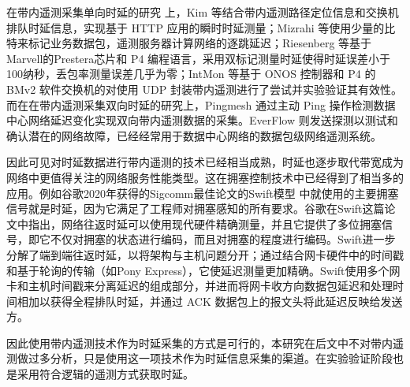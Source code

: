 在带内遥测采集单向时延的研究 \cite{INTSURVEY} 上，Kim \cite{KIM} 等结合带内遥测路径定位信息和交换机排队时延信息，实现基于 \gls*{HTTP} 应用的瞬时时延测量；Mizrahi \cite{MIZRAHI} 等使用少量的比特来标记业务数据包，遥测服务器计算网络的逐跳延迟；Riesenberg \cite{INTRIE} 等基于Marvell的Prestera芯片和 \gls*{P4} 编程语言，采用双标记测量时延使得时延误差小于100纳秒，丢包率测量误差几乎为零；IntMon \cite{INTMON} 等基于 \gls*{ONOS} 控制器和 \gls*{P4} 的 \gls*{BMv2} 软件交换机的对使用 \gls*{UDP} 封装带内遥测进行了尝试并实验验证其有效性。而在在带内遥测采集双向时延的研究上，Pingmesh \cite{PINGMASH} 通过主动 \gls*{Ping} 操作检测数据中心网络延迟变化实现双向带内遥测数据的采集。EverFlow \cite{EVERFLOW} 则发送探测以测试和确认潜在的网络故障，已经经常用于数据中心网络的数据包级网络遥测系统。

因此可见对时延数据进行带内遥测的技术已经相当成熟，时延也逐步取代带宽成为网络中更值得关注的网络服务性能类型。这在拥塞控制技术中已经得到了相当多的应用。例如谷歌2020年获得的Sigcomm最佳论文的Swift模型 \cite{SWIFT} 中就使用的主要拥塞信号就是时延，因为它满足了工程师对拥塞感知的所有要求。谷歌在Swift这篇论文中指出，网络往返时延可以使用现代硬件精确测量，并且它提供了多位拥塞信号，即它不仅对拥塞的状态进行编码，而且对拥塞的程度进行编码。Swift进一步分解了端到端往返时延，以将架构与主机问题分开；通过结合网卡硬件中的时间戳和基于轮询的传输（如Pony Express），它使延迟测量更加精确。Swift使用多个网卡和主机时间戳来分离延迟的组成部分，并进而将网卡收方向数据包延迟和处理时间相加以获得全程排队时延，并通过 \gls*{ACK} 数据包上的报文头将此延迟反映给发送方。

因此使用带内遥测技术作为时延采集的方式是可行的，本研究在后文中不对带内遥测做过多分析，只是使用这一项技术作为时延信息采集的渠道。在实验验证阶段也是采用符合逻辑的遥测方式获取时延。



\ifx\usechapbib\empty
\nocite{BSTcontrol}
\setcounter{NAT@ctr}{0}


\fi
